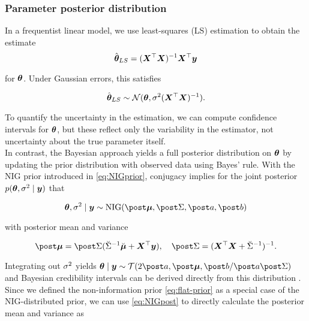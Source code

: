 \subsubsection*{Parameter posterior distribution}

In a frequentist linear model, we use least-squares (LS) estimation to obtain the estimate
\begin{equation}\label{eq:LSE}
    \hat{\bm{\theta}}_{LS} = (\bm{X}^\top \bm{X})^{-1} \bm{X}^\top \bm{y}
\end{equation}

for $\bm{\theta}$.
Under Gaussian errors, this satisfies

\begin{equation*}
    \hat{\bm{\theta}}_{LS} \sim \mathcal{N}(\bm{\theta}, \sigma^2 (\bm{X}^\top \bm{X})^{-1}).
\end{equation*}

To quantify the uncertainty in the estimation, we can compute confidence intervals for $\bm{\theta}$, but these reflect only the variability in the estimator, not uncertainty about the true parameter itself.\\

In contrast, the Bayesian approach yields a full posterior distribution on $\bm{\theta}$ by updating the prior distribution with observed data using Bayes' rule.
With the NIG prior introduced in \eqref{eq:NIGprior}, conjugacy implies for the joint posterior $p(\bm{\theta}, \sigma^2 \mid \bm{y})$ that

\begin{equation*}
    \btheta, \ssd \mid \by \sim \text{NIG}(\mupo, \Sdpo, \apo, \bpo)
\end{equation*}

with posterior mean and variance \footnotemark

\begin{equation} \label{eq:NIGpost}
        \mupo = \Sdpo (\Sdipri \mupri + \bX^\top \by), \quad \Sdpo = (\bX^\top \bX + \Sdipri)^{-1}.
\end{equation}


Integrating out $\sigma^2$ yields $\btheta \mid \by \sim \Tcal(2 \apo, \mupo, \bpo / \apo \Sdpo)$ and Bayesian credibility intervals can be derived directly from this distribution \citep{held_likelihood_2020}.\\

Since we defined the non-information prior \eqref{eq:flat-prior} as a special case of the NIG-distributed prior, we can use \eqref{eq:NIGpost} to directly calculate the posterior mean and variance as

